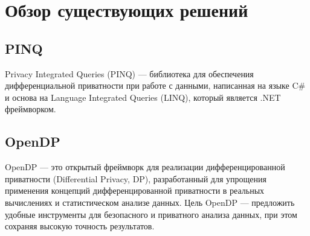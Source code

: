 \chapter{Обзор существующих решений}
\section{PINQ}
Privacy Integrated Queries (PINQ) --- библиотека для обеспечения дифференциальной приватности при работе с данными, написанная на языке C\# и основа на Language Integrated Queries (LINQ), который является .NET фреймворком.~\cite{Lee2008}







\section{OpenDP}
OpenDP — это открытый фреймворк для реализации дифференцированной приватности (Differential Privacy, DP), разработанный для упрощения применения концепций дифференцированной приватности в реальных вычислениях и статистическом анализе данных. Цель OpenDP — предложить удобные инструменты для безопасного и приватного анализа данных, при этом сохраняя высокую точность результатов.

